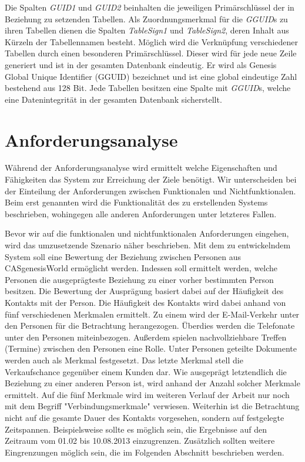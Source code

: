 Die Spalten \textit{GUID1} und \textit{GUID2} beinhalten die jeweiligen Primärschlüssel der in Beziehung zu setzenden Tabellen. Als Zuordnungsmerkmal für die \textit{GGUID}s zu ihren Tabellen dienen die Spalten \textit{TableSign1} und \textit{TableSign2}, deren Inhalt aus Kürzeln der Tabellennamen besteht. Möglich wird die Verknüpfung verschiedener Tabellen durch einen besonderen Primärschlüssel. Dieser wird für jede neue Zeile generiert und ist in der gesamten Datenbank eindeutig. Er wird als Genesis Global Unique Identifier (GGUID) bezeichnet und ist eine global eindeutige Zahl bestehend aus 128 Bit. Jede Tabellen besitzen eine Spalte mit \textit{GGUID}s, welche eine Datenintegrität in der gesamten Datenbank sicherstellt.

\section{Anforderungsanalyse}
\label{ch:Systemanalyse:sec:Anforderungsanalyse}

Während der Anforderungsanalyse wird ermittelt welche Eigenschaften und Fähigkeiten das System zur Erreichung der Ziele benötigt. Wir unterscheiden bei der Einteilung der Anforderungen zwischen Funktionalen und Nichtfunktionalen. Beim erst genannten wird die Funktionalität des zu erstellenden Systems beschrieben, wohingegen alle anderen Anforderungen unter letzteres Fallen. 

Bevor wir auf die funktionalen und nichtfunktionalen Anforderungen eingehen, wird das umzusetzende Szenario näher beschrieben. Mit dem zu entwickelndem System soll eine Bewertung der Beziehung zwischen Personen aus CASgenesisWorld ermöglicht werden. Indessen soll ermittelt werden, welche Personen die ausgeprägteste Beziehung zu einer vorher bestimmten Person besitzen. Die Bewertung der Ausprägung basiert dabei auf der Häufigkeit des Kontakts mit der Person. Die Häufigkeit des Kontakts wird dabei anhand von fünf verschiedenen Merkmalen ermittelt. Zu einem wird der E-Mail-Verkehr unter den Personen für die Betrachtung herangezogen. Überdies werden die Telefonate unter den Personen miteinbezogen. Außerdem spielen nachvollziehbare Treffen (Termine) zwischen den Personen eine Rolle. Unter Personen geteilte Dokumente werden auch als Merkmal festgesetzt. Das letzte Merkmal stell die Verkaufschance gegenüber einem Kunden dar. Wie ausgeprägt letztendlich die Beziehung zu einer anderen Person ist, wird anhand der Anzahl solcher Merkmale ermittelt. Auf die fünf Merkmale wird im weiteren Verlauf der Arbeit nur noch mit dem Begriff "Verbindungsmerkmale" verwiesen. Weiterhin ist die Betrachtung nicht auf die gesamte Dauer des Kontakts vorgesehen, sondern auf festgelegte Zeitspannen. Beispielsweise sollte es möglich sein, die Ergebnisse auf den Zeitraum vom 01.02 bis 10.08.2013 einzugrenzen. Zusätzlich sollten weitere Eingrenzungen möglich sein, die im Folgenden Abschnitt beschrieben werden.

